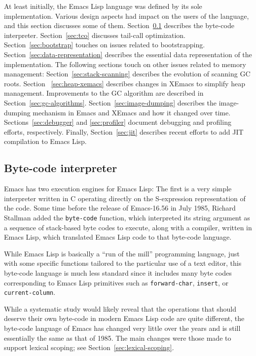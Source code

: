 \documentclass[format=acmsmall, review]{acmart}
\newcommand \Elisp {Emacs Lisp}
\begin{document}
At least initially, the \Elisp{} language was defined by its sole
implementation.  Various design aspects had impact on the users of the
language, and this section discusses some of them.
Section~\ref{sec:byte-code-interpreter} describes the byte-code
interpreter.
Section~\ref{sec:tco} discusses tail-call optimization.
Section~\ref{sec:bootstrap} touches on issues related to bootstrapping.
Section~\ref{sec:data-representation} describes the
essential data representation of the implementation.  The following
sections touch on other issues related to memory management:
Section~\ref{sec:stack-scanning} describes the evolution of scanning
GC roots. Section ~\ref{sec:heap-xemacs} describes changes in XEmacs
to simplify heap management.  Improvements to
the GC algorithm are described in Section~\ref{sec:gc-algorithms}.
Section~\ref{sec:image-dumping} describes the
image-dumping mechanism in Emacs and XEmacs and how it changed over time.
Sections~\ref{sec:debugger} and \ref{sec:profiler} document
debugging and profiling efforts, respectively.  Finally,
Section~\ref{sec:jit} describes recent efforts to add JIT compilation
to \Elisp{}.

\subsection{Byte-code interpreter}
\label{sec:byte-code-interpreter}

Emacs has two execution engines for \Elisp: The first is a very simple
interpreter written in C operating directly on the S-expression
representation of the code.
Some time before the release of Emacs-16.56 in July 1985,
Richard Stallman added the \texttt{byte-code} function, which interpreted its string
argument as a sequence of stack-based byte codes to execute, along with
a compiler, written in \Elisp{}, which translated \Elisp{} code to that
byte-code language.

While \Elisp{} is basically a ``run of the mill'' programming language, just
with some specific functions tailored to the particular use of a text
editor, this byte-code language is much less standard since it includes many
byte codes corresponding to \Elisp{} primitives such as
\texttt{forward-char}, \texttt{insert}, or \texttt{current-column}.

While a systematic study would likely reveal that the operations that should
deserve their own byte-code in modern \Elisp{} code are quite different, the
byte-code language of Emacs has changed very little over the years and is
still essentially the same as that of 1985.  The main changes were
those made to support lexical scoping; see Section~\ref{sec:lexical-scoping}.
\end{document}
